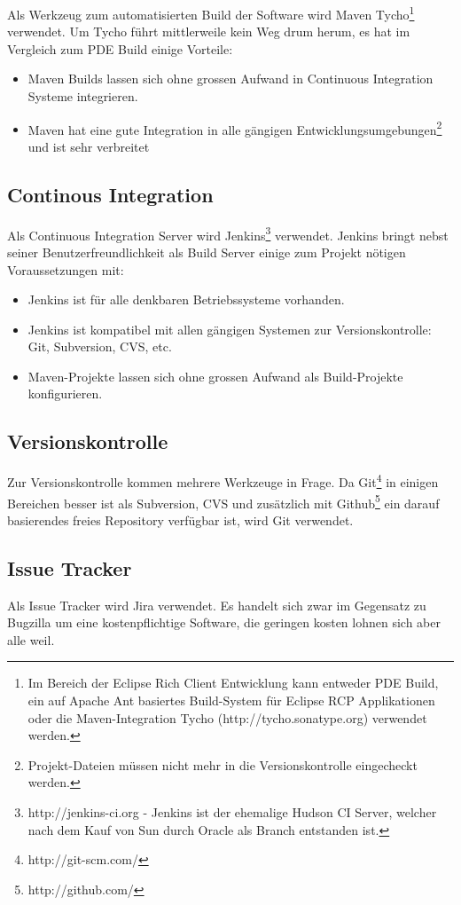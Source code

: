 Als Werkzeug zum automatisierten Build der Software wird Maven Tycho\footnote{Im Bereich der Eclipse Rich Client Entwicklung kann entweder PDE Build, ein auf Apache Ant basiertes Build-System für Eclipse RCP Applikationen\cite{vogelZapfPdeBuild} oder die Maven-Integration Tycho (http://tycho.sonatype.org) verwendet werden.} verwendet. Um Tycho führt mittlerweile kein Weg drum herum, es hat im Vergleich zum PDE Build einige Vorteile:
\begin{itemize}
	\item Maven Builds lassen sich ohne grossen Aufwand in Continuous Integration Systeme integrieren.
	\item Maven hat eine gute Integration in alle gängigen Entwicklungsumgebungen\footnote{Projekt-Dateien müssen nicht mehr in die Versionskontrolle eingecheckt werden.} und ist sehr verbreitet
\end{itemize}

\subsection{Continous Integration}
Als Continuous Integration Server wird Jenkins\footnote{http://jenkins-ci.org - Jenkins ist der ehemalige Hudson CI Server, welcher nach dem Kauf von Sun durch Oracle als Branch entstanden ist.} verwendet. Jenkins bringt nebst seiner Benutzerfreundlichkeit als Build Server einige zum Projekt nötigen Voraussetzungen mit:
\begin{itemize}
	\item Jenkins ist für alle denkbaren Betriebssysteme vorhanden.
	\item Jenkins ist kompatibel mit allen gängigen Systemen zur Versionskontrolle: Git, Subversion, CVS, etc.
	\item Maven-Projekte lassen sich ohne grossen Aufwand als Build-Projekte konfigurieren.
\end{itemize}

\subsection{Versionskontrolle}
Zur Versionskontrolle kommen mehrere Werkzeuge in Frage. Da Git\footnote{http://git-scm.com/} in einigen Bereichen besser ist als Subversion, CVS und zusätzlich mit Github\footnote{http://github.com/} ein darauf basierendes freies Repository verfügbar ist, wird Git verwendet.
\subsection{Issue Tracker}
Als Issue Tracker wird Jira verwendet. Es handelt sich zwar im Gegensatz zu Bugzilla um eine kostenpflichtige Software, die geringen kosten lohnen sich aber alle weil. 

